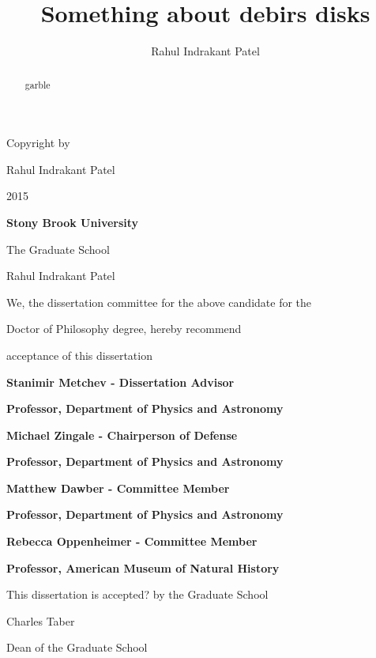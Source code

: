 \documentclass[phd,bottom,nosig]{usbthesis}
\author{Rahul Indrakant Patel}%
\title{Something about debirs disks}%
\begin{document}
\singlespacing %

\maketitle %


\newpage
{}

\vspace*{32\baselineskip}
\vspace*{1\baselineskip}
\centerline{Copyright by}
\centerline{Rahul Indrakant Patel}
\centerline{2015}


\newpage
{}
\setcounter{page}{2}

\centerline{\bf{Stony Brook University}}
\vspace*{1\baselineskip}
\centerline{The Graduate School}
\vspace*{2\baselineskip}
\centerline{Rahul Indrakant Patel}
\vspace*{2\baselineskip}
\centerline{We, the dissertation committee for the above candidate for the}
\vspace*{1\baselineskip}
\centerline{Doctor of Philosophy degree, hereby recommend}
\vspace*{1\baselineskip}
\centerline{acceptance of this dissertation}
\vspace*{2\baselineskip}
\centerline{\bf{Stanimir Metchev - Dissertation Advisor}}
\centerline{\bf{Professor, Department of Physics and Astronomy}}
\vspace*{1\baselineskip}
\centerline{\bf{Michael Zingale - Chairperson of Defense}}
\centerline{\bf{Professor, Department of Physics and Astronomy}}
\vspace*{1\baselineskip}
\centerline{\bf{Matthew Dawber - Committee Member}}
\centerline{\bf{Professor, Department of Physics and Astronomy}}
\vspace*{1\baselineskip}
\centerline{\bf{Rebecca Oppenheimer - Committee Member}}
\centerline{\bf{Professor, American Museum of Natural History}}
\vspace*{2\baselineskip}
\centerline{This dissertation is accepted? by the Graduate School}
\vspace*{3\baselineskip}
\centerline{Charles Taber}
\centerline{Dean of the Graduate School}

\newpage

\begin{abstract}
    garble%
\end{abstract}
\end{document}
